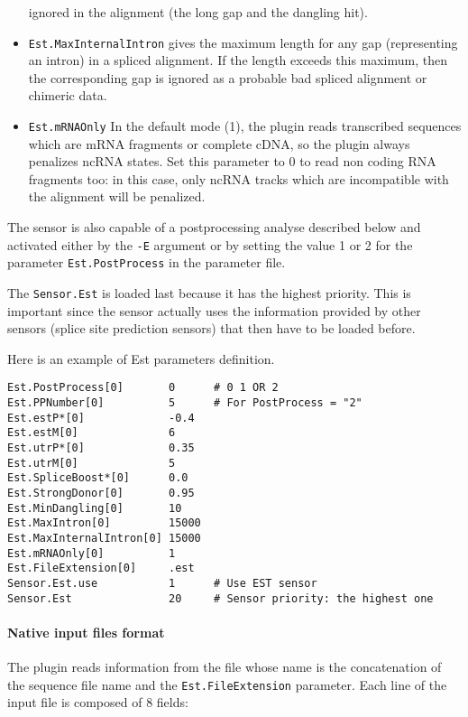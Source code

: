 \begin{itemize}
  ignored in the alignment (the long gap and the dangling hit).
\item \texttt{Est.MaxInternalIntron} gives the maximum length for any
  gap (representing an intron) in a spliced alignment. If the length
  exceeds this maximum, then the corresponding gap is ignored as
  a probable bad spliced alignment or chimeric data.
\item \texttt{Est.mRNAOnly} In the default mode (1), the plugin reads 
transcribed sequences which are mRNA fragments or complete cDNA, 
so the plugin always penalizes ncRNA states. Set this parameter to 0 
to read non coding RNA fragments too: in this case, only ncRNA tracks 
which are incompatible with the alignment will be penalized.

\end{itemize}

The sensor is also capable of a postprocessing analyse described below
and activated either by the \texttt{-E} argument or by setting the value
1 or 2 for the parameter \texttt{Est.PostProcess} in the parameter
file.

The \texttt{Sensor.Est} is loaded last because it has the highest priority.
This is important since the sensor actually uses the information
provided by other sensors (splice site prediction sensors) that then have to be loaded before.

Here is an example of Est parameters definition.
\begin{Verbatim}[fontsize=\small]
Est.PostProcess[0]       0      # 0 1 OR 2
Est.PPNumber[0]          5      # For PostProcess = "2"
Est.estP*[0]             -0.4
Est.estM[0]              6
Est.utrP*[0]             0.35
Est.utrM[0]              5
Est.SpliceBoost*[0]      0.0
Est.StrongDonor[0]       0.95
Est.MinDangling[0]       10
Est.MaxIntron[0]         15000
Est.MaxInternalIntron[0] 15000
Est.mRNAOnly[0]          1
Est.FileExtension[0]     .est
Sensor.Est.use           1      # Use EST sensor
Sensor.Est               20     # Sensor priority: the highest one

\end{Verbatim}


\paragraph{Native input files format}

The plugin reads information from the file whose name is the concatenation 
of the sequence file name and the \texttt{Est.FileExtension} parameter. 
Each line of the input file is composed of 8 fields:


